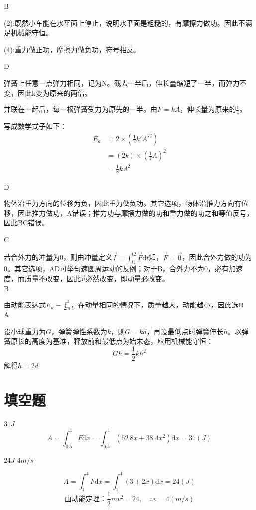 \documentclass[b5paper,opensource]{qyxf-book}
\newcommand{\di}[1]{\mathrm{d}#1}
\begin{document}
B

(2):既然小车能在水平面上停止，说明水平面是粗糙的，有摩擦力做功。因此不满足机械能守恒。

(4):重力做正功，摩擦力做负功，符号相反。

D

弹簧上任意一点弹力相同，记为N。截去一半后，伸长量缩短了一半，而弹力不变，因此k变为原来的两倍。

并联在一起后，每一根弹簧受力为原先的一半。由$F=kA$，伸长量为原来的$\frac{1}{4}$。

写成数学式子如下：
\begin{align*}
E_k &=2\times\left(\frac{1}{2}k'A'^2\right)\\
&=\left(2k\right)\times\left(\frac{1}{4}A\right)^2\\
&=\frac{1}{8}kA^2
\end{align*}

D

物体沿重力方向的位移为负，因此重力做负功。其它选项，物体沿推力方向有位移，因此推力做功，A错误；推力功与摩擦力做的功和重力做的功之和等值反号，因此BC错误。

C

若合外力的冲量为0，则由冲量定义$\vec{I}=\int_{t1}^{t2}\vec{F}\di{t}$知，$\vec{F}=\vec{0}$，因此合外力做的功为0。其它选项，AD可举匀速圆周运动的反例；对于B，合外力不为0，必有加速度，而质量不改变，因此$\vec{v}$必然改变，即动量必改变。\\

B

由动能表达式$E_k=\frac{p^2}{2m}$，在动量相同的情况下，质量越大，动能越小，因此选B\\

A

设小球重力为$G$，弹簧弹性系数为$k$，则$G=kd$，再设最低点时弹簧伸长$h$。以弹簧原长的高度为基准，释放前和最低点为始末态，应用机械能守恒：
\[Gh=\frac{1}{2}kh^2\]
解得$h=2d$

\section{填空题}

$31J$
\[A=\int_{0.5}^{1}F\di{x}=\int_{0.5}^{1}(52.8x+38.4x^2)\di{x}=31(J)\]

$24J$ $4m/s$

\[A=\int_{1}^{4}F\di{x}=\int_{1}^{4}(3+2x)\di{x}=24(J)\]
\[\text{由动能定理：}\frac{1}{2}mv^2=24,\quad \therefore v=4(m/s)\]
\end{document}

